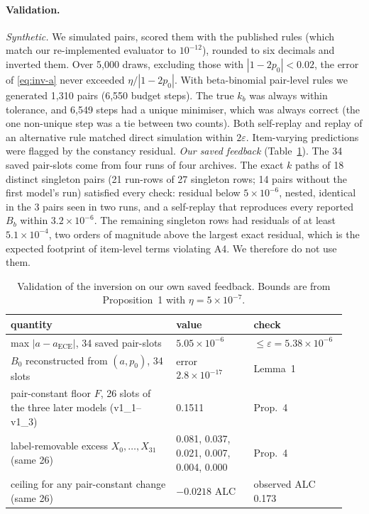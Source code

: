 \paragraph{Validation.}
\emph{Synthetic.} We simulated pairs, scored them with the published rules (which match our re-implemented evaluator to
$10^{-12}$), rounded to six decimals and inverted them. Over 5{,}000 draws, excluding those with $|1-2p_0|<0.02$, the
error of \eqref{eq:inv-a} never exceeded $\eta/|1-2p_0|$. With beta-binomial pair-level rules we generated 1{,}310
pairs (6{,}550 budget steps). The true $k_b$ was always within tolerance, and 6{,}549 steps had a unique minimiser,
which was always correct (the one non-unique step was a tie between two counts). Both self-replay and replay of an
alternative rule matched direct simulation within $2\varepsilon$. Item-varying predictions were flagged by the constancy
residual.
\emph{Our saved feedback} (Table~\ref{tab:inv-val}). The 34 saved pair-slots come from four runs of four archives.
The exact $k$ paths of 18 distinct singleton pairs (21 run-rows of 27 singleton rows; 14 pairs
without the first model's run) satisfied every check: residual below $5\times10^{-6}$, nested, identical in the 3
pairs seen in two runs, and a self-replay that reproduces every reported $B_b$ within $3.2\times10^{-6}$. The
remaining singleton rows had residuals of at least $5.1\times10^{-4}$, two orders of magnitude above the largest
exact residual, which is the expected footprint of item-level terms violating A4. We therefore do not use them.

\begin{table}[h]
\centering\footnotesize
\caption{Validation of the inversion on our own saved feedback. Bounds are from Proposition~1 with $\eta=5\times10^{-7}$.}
\label{tab:inv-val}
\begin{tabular}{@{}p{0.47\linewidth}p{0.22\linewidth}p{0.25\linewidth}@{}}
\toprule
quantity & value & check\\
\midrule
max $|a-a_{\mathrm{ECE}}|$, 34 saved pair-slots & $5.05\times10^{-6}$ & $\le\varepsilon=5.38\times10^{-6}$\\
$B_0$ reconstructed from $(a,p_0)$, 34 slots & error $2.8\times10^{-17}$ & Lemma~1\\
pair-constant floor $F$, 26 slots of the three later models (v1\_1--v1\_3) & 0.1511 & Prop.~4\\
label-removable excess $X_0,\dots,X_{31}$ (same 26) & 0.081, 0.037, 0.021, 0.007, 0.004, 0.000 & Prop.~4\\
ceiling for any pair-constant change (same 26) & $-0.0218$ ALC & observed ALC 0.173\\
\bottomrule
\end{tabular}
\end{table}

